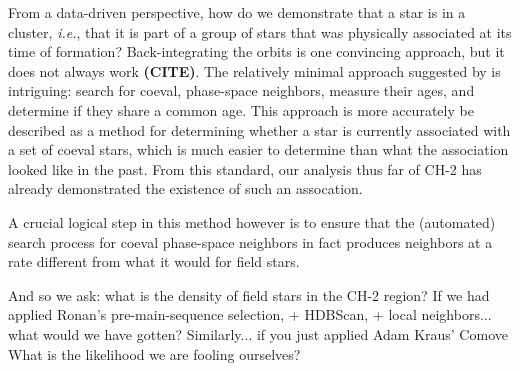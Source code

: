 \documentclass[12pt,twocolumn,linenumbers]{aastex63}
\begin{document}
From a data-driven perspective, how do we demonstrate that a star is
in a cluster, {\it i.e.}, that it is part of a group of stars that was
physically associated at its time of formation?
Back-integrating the orbits is one convincing approach, but it does
not always work {\bf (CITE)}.
The relatively minimal approach suggested by \citet{tofflemire_2021}
is intriguing: search for coeval, phase-space neighbors, measure their
ages, and determine if they share a common age.
This approach is more accurately be described as a method for
determining whether a star is currently associated with a set of coeval
stars, which is much easier to determine than what the association
looked like in the past.
From this standard, our analysis thus far of CH-2 has already
demonstrated the existence of such an assocation.

A crucial logical step in this method however is to ensure that the
(automated) search process for coeval phase-space neighbors in fact
produces neighbors at a rate different from what it would for field
stars.

And so we ask: what is the density of field stars in the CH-2 region?
If we had applied Ronan's pre-main-sequence selection, + HDBScan, +
local neighbors... what would we have gotten?
Similarly... if you just applied Adam Kraus' Comove 
What is the likelihood we are fooling ourselves?
\end{document}
